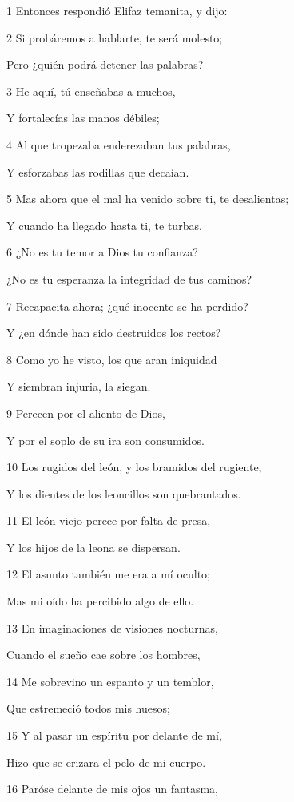 \par 1 Entonces respondió Elifaz temanita, y dijo:
\par 2 Si probáremos a hablarte, te será molesto;
\par Pero ¿quién podrá detener las palabras?
\par 3 He aquí, tú enseñabas a muchos,
\par Y fortalecías las manos débiles;
\par 4 Al que tropezaba enderezaban tus palabras,
\par Y esforzabas las rodillas que decaían. 
\par 5 Mas ahora que el mal ha venido sobre ti, te desalientas;
\par Y cuando ha llegado hasta ti, te turbas.
\par 6 ¿No es tu temor a Dios tu confianza?
\par ¿No es tu esperanza la integridad de tus caminos? 
\par 7 Recapacita ahora; ¿qué inocente se ha perdido?
\par Y ¿en dónde han sido destruidos los rectos?
\par 8 Como yo he visto, los que aran iniquidad
\par Y siembran injuria, la siegan.
\par 9 Perecen por el aliento de Dios,
\par Y por el soplo de su ira son consumidos.
\par 10 Los rugidos del león, y los bramidos del rugiente,
\par Y los dientes de los leoncillos son quebrantados. 
\par 11 El león viejo perece por falta de presa,
\par Y los hijos de la leona se dispersan.
\par 12 El asunto también me era a mí oculto;
\par Mas mi oído ha percibido algo de ello.
\par 13 En imaginaciones de visiones nocturnas,
\par Cuando el sueño cae sobre los hombres,
\par 14 Me sobrevino un espanto y un temblor,
\par Que estremeció todos mis huesos;
\par 15 Y al pasar un espíritu por delante de mí,
\par Hizo que se erizara el pelo de mi cuerpo.
\par 16 Paróse delante de mis ojos un fantasma,
